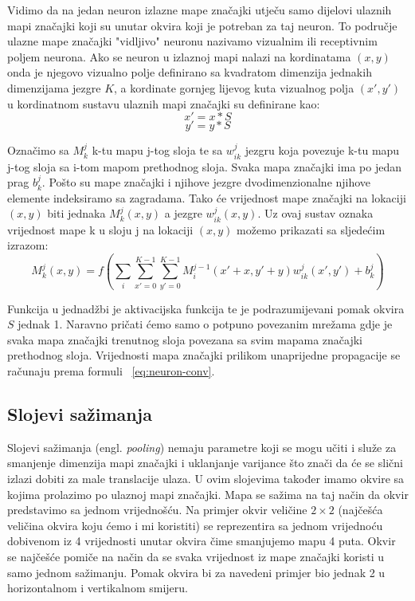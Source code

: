 \documentclass[times, utf8, zavrsni, numeric]{fer}
\begin{document}
Vidimo da na jedan neuron izlazne mape značajki utječu samo dijelovi ulaznih mapi značajki koji su unutar okvira koji je potreban za taj neuron. To područje ulazne mape značajki "vidljivo" neuronu nazivamo vizualnim ili receptivnim poljem neurona. Ako se neuron u izlaznoj mapi nalazi na kordinatama $(x, y)$ onda je njegovo vizualno polje definirano sa kvadratom dimenzija jednakih dimenzijama jezgre $K$, a kordinate gornjeg lijevog kuta vizualnog polja $(x', y')$ u kordinatnom sustavu ulaznih mapi značajki su definirane kao:
\begin{equation}
x' = x*S
\end{equation}
\begin{equation}
y' = y*S
\end{equation}

Označimo sa $M^j_k$ k-tu mapu j-tog sloja te sa $w^j_{ik}$ jezgru koja povezuje k-tu mapu j-tog sloja sa i-tom mapom prethodnog sloja. Svaka mapa značajki ima po jedan prag $b^j_k$. Pošto su mape značajki i njihove jezgre dvodimenzionalne njihove elemente indeksiramo sa zagradama. Tako će vrijednost mape značajki na lokaciji $(x, y)$ biti jednaka $M^j_k (x, y)$ a jezgre $w^j_{ik} (x, y)$. Uz ovaj sustav oznaka vrijednost mape k u sloju j na lokaciji $(x, y)$ možemo prikazati sa sljedećim izrazom:
\begin{equation}\label{eq:neuron-conv}
M^j_k (x, y) = f(\sum_i \sum_{x'=0}^{K-1} \sum_{y'=0}^{K-1} M^{j-1}_i (x' + x, y' + y) w^j_{ik} (x', y') + b^j_k )
\end{equation}

Funkcija u jednadžbi je aktivacijska funkcija te je podrazumijevani pomak okvira $S$ jednak 1. Naravno pričati ćemo samo o potpuno povezanim mrežama gdje je svaka mapa značajki trenutnog sloja povezana sa svim mapama značajki prethodnog sloja. Vrijednosti mapa značajki prilikom unaprijedne propagacije se računaju prema formuli ~\ref{eq:neuron-conv}.

\subsection{Slojevi sažimanja}\label{Slojevi sažimanja}
Slojevi sažimanja (engl. \textit{pooling}) nemaju parametre koji se mogu učiti i služe za smanjenje dimenzija mapi značajki i uklanjanje varijance što znači da će se slični izlazi dobiti za male translacije ulaza. U ovim slojevima također imamo okvire sa kojima prolazimo po ulaznoj mapi značajki. Mapa se sažima na taj način da okvir predstavimo sa jednom vrijednošću. Na primjer okvir veličine $2 \times 2$ (najčešća veličina okvira koju ćemo i mi koristiti) se reprezentira sa jednom vrijednoću dobivenom iz 4 vrijednosti unutar okvira čime smanjujemo mapu 4 puta. Okvir se najčešće pomiče na način da se svaka vrijednost iz mape značajki koristi u samo jednom sažimanju. Pomak okvira bi za navedeni primjer bio jednak 2 u horizontalnom i vertikalnom smijeru.
\end{document}

